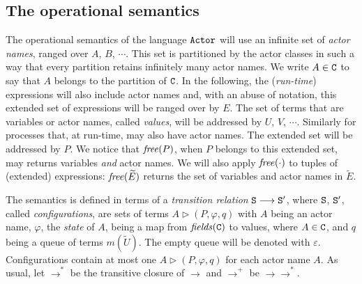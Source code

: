 \documentclass{LMCS}
\theoremstyle{plain}\newtheorem{proposition}[thm]{Proposition}
\theoremstyle{plain}\newtheorem{lemma}[thm]{Lemma}
\theoremstyle{plain}\newtheorem{theorem}[thm]{Theorem}
\theoremstyle{plain}\newtheorem{corollary}[thm]{Corollary}
\newif\ifconf \conffalse
\newcommand{\State}{{\tt S}}
\newcommand{\lred}[1]{\stackrel{#1}{\longrightarrow}}
\newcommand{\free}[1]{{\it free}(#1)}
\newcommand{\fields}[1]{{\it fields}(#1)}
\newcommand{\wt}[1]{\widetilde{#1}}
\newcommand{\adef}[1]{{\tt #1}}
\newcommand{\actor}{${\tt Actor}$}
\begin{document}
\fi

\ifconf
\paragraph{The operational semantics.}
\else
\subsection{The operational semantics}
\fi
The operational semantics of the language {\actor} will use an infinite set of 
\emph{actor names}, ranged over $A$, $B$, $\cdots$. This set
is partitioned by the actor classes in such a way that every partition retains 
infinitely many actor names. We write $A \in \adef{C}$ to say that $A$ 
belongs to the partition of $\adef{C}$.
In the following, the (\emph{run-time}) expressions 
will also include actor names and, with an abuse of notation, this extended
set of expressions
will be ranged over by $E$. The set of terms that are variables or 
actor names, called \emph{values}, will be addressed by $U$, $V$, $\cdots$.
Similarly for processes that, at run-time, may also have actor names. The extended
set will be addressed by $P$. We notice that $\free{P}$, when $P$ belongs to this
extended set, may returns variables \emph{and} actor names. We will also apply
$\free{\cdot}$ to tuples of (extended) expressions: $\free{  \wt{E}}$ returns
the set of variables and actor names in  $\wt{E}$.

The semantics is defined in terms of a \emph{transition relation}
$\State \lred{} \State'$, where $\State$, $\State'$, called \emph{configurations}, are
 sets of terms $A \triangleright (P, \varphi, q)$ with 
$A$ being an actor name,
$\varphi$, the \emph{state} of $A$, being a map from $\fields{\adef{C}}$ to values, 
where $A \in \adef{C}$,
and $q$ being a queue of terms $m(\wt{U})$. 
The empty queue will be denoted with $\varepsilon$.
Configurations contain at most one $A \triangleright (P, \varphi, q)$
for each actor name $A$. As usual, let $\lred{}^*$ be the transitive closure of 
$\lred{}$ and $\lred{}^+$ be $\lred{}\lred{}^*$.
\end{document}
